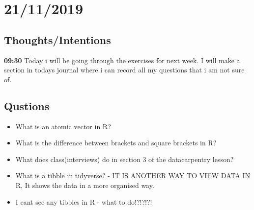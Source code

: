 \documentclass{article}
\begin{document}
\section{21/11/2019}
\subsection{Thoughts/Intentions}
\textbf{09:30} Today i will be going through the exercises for next week. I will make a section in todays journal where i can record all my questions that i am not sure of.
\subsection{Qustions}
\begin{itemize}
    \item What is an atomic vector in R?
    \item What is the difference between brackets and square brackets in R?
    \item What does class(interviews) do in section 3 of the datacarpentry lesson?
    \item What is a tibble in tidyverse? - IT IS ANOTHER WAY TO VIEW DATA IN R, It shows the data in a more organised way.
    \item I cant see any tibbles in R - what to do!?!?!?!
\end{itemize}
\end{document}
